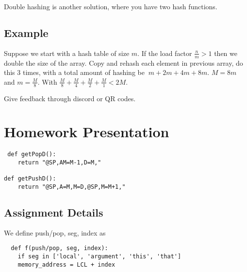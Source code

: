 \documentclass[12pt]{article}
\begin{document}
Double hashing is another solution, where you have two hash functions. 

\subsection*{Example}
Suppose we start with a hash table of size $m$. If the load factor $\frac{n}{m} > 1$ then we double
the size of the array. Copy and rehash each element in previous array, do this 3 times, with a total
amount of hashing be $~m + 2m + 4m + 8m$. $M=8m$ and $m = \frac{M}{8}$. With $\frac{M}{8} + \frac{M}{4} +
\frac{M}{2} + \frac{M}{1} < 2M$.

Give feedback through discord or QR codes.

\section*{Homework Presentation}
\begin{verbatim}
 def getPopD():
    return "@SP,AM=M-1,D=M,"

def getPushD():
    return "@SP,A=M,M=D,@SP,M=M+1,"
\end{verbatim}

\subsection*{Assignment Details}
We define push/pop, seg, index as
\begin{verbatim}
  def f(push/pop, seg, index):
    if seg in ['local', 'argument', 'this', 'that']
    memory_address = LCL + index
\end{verbatim}
\end{document}
